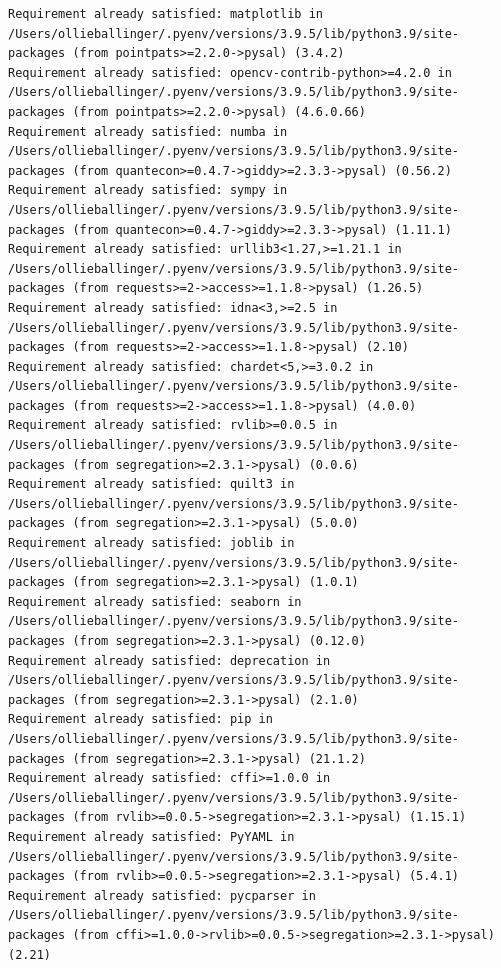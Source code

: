 \documentclass[
  letterpaper,
  DIV=11,
  numbers=noendperiod]{scrreprt}
\begin{document}
\begin{verbatim}
Requirement already satisfied: matplotlib in /Users/ollieballinger/.pyenv/versions/3.9.5/lib/python3.9/site-packages (from pointpats>=2.2.0->pysal) (3.4.2)
Requirement already satisfied: opencv-contrib-python>=4.2.0 in /Users/ollieballinger/.pyenv/versions/3.9.5/lib/python3.9/site-packages (from pointpats>=2.2.0->pysal) (4.6.0.66)
Requirement already satisfied: numba in /Users/ollieballinger/.pyenv/versions/3.9.5/lib/python3.9/site-packages (from quantecon>=0.4.7->giddy>=2.3.3->pysal) (0.56.2)
Requirement already satisfied: sympy in /Users/ollieballinger/.pyenv/versions/3.9.5/lib/python3.9/site-packages (from quantecon>=0.4.7->giddy>=2.3.3->pysal) (1.11.1)
Requirement already satisfied: urllib3<1.27,>=1.21.1 in /Users/ollieballinger/.pyenv/versions/3.9.5/lib/python3.9/site-packages (from requests>=2->access>=1.1.8->pysal) (1.26.5)
Requirement already satisfied: idna<3,>=2.5 in /Users/ollieballinger/.pyenv/versions/3.9.5/lib/python3.9/site-packages (from requests>=2->access>=1.1.8->pysal) (2.10)
Requirement already satisfied: chardet<5,>=3.0.2 in /Users/ollieballinger/.pyenv/versions/3.9.5/lib/python3.9/site-packages (from requests>=2->access>=1.1.8->pysal) (4.0.0)
Requirement already satisfied: rvlib>=0.0.5 in /Users/ollieballinger/.pyenv/versions/3.9.5/lib/python3.9/site-packages (from segregation>=2.3.1->pysal) (0.0.6)
Requirement already satisfied: quilt3 in /Users/ollieballinger/.pyenv/versions/3.9.5/lib/python3.9/site-packages (from segregation>=2.3.1->pysal) (5.0.0)
Requirement already satisfied: joblib in /Users/ollieballinger/.pyenv/versions/3.9.5/lib/python3.9/site-packages (from segregation>=2.3.1->pysal) (1.0.1)
Requirement already satisfied: seaborn in /Users/ollieballinger/.pyenv/versions/3.9.5/lib/python3.9/site-packages (from segregation>=2.3.1->pysal) (0.12.0)
Requirement already satisfied: deprecation in /Users/ollieballinger/.pyenv/versions/3.9.5/lib/python3.9/site-packages (from segregation>=2.3.1->pysal) (2.1.0)
Requirement already satisfied: pip in /Users/ollieballinger/.pyenv/versions/3.9.5/lib/python3.9/site-packages (from segregation>=2.3.1->pysal) (21.1.2)
Requirement already satisfied: cffi>=1.0.0 in /Users/ollieballinger/.pyenv/versions/3.9.5/lib/python3.9/site-packages (from rvlib>=0.0.5->segregation>=2.3.1->pysal) (1.15.1)
Requirement already satisfied: PyYAML in /Users/ollieballinger/.pyenv/versions/3.9.5/lib/python3.9/site-packages (from rvlib>=0.0.5->segregation>=2.3.1->pysal) (5.4.1)
Requirement already satisfied: pycparser in /Users/ollieballinger/.pyenv/versions/3.9.5/lib/python3.9/site-packages (from cffi>=1.0.0->rvlib>=0.0.5->segregation>=2.3.1->pysal) (2.21)

\end{verbatim}
\end{document}
